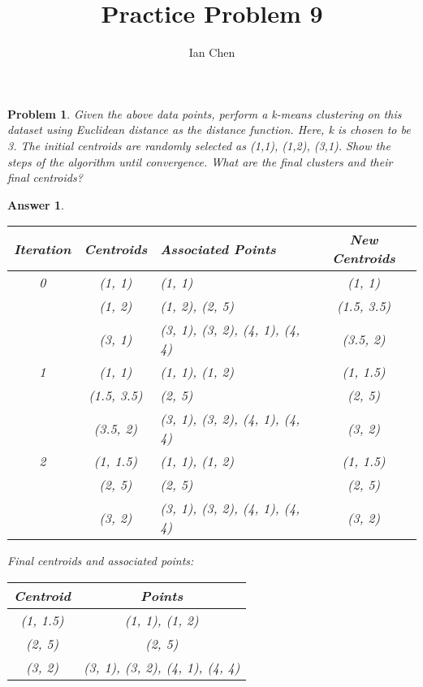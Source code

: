 \documentclass[11pt]{article}
\author{Ian Chen}
\title{Practice Problem 9}
\theoremstyle{description}
\newtheorem{problem}{Problem}
\theoremstyle{break}
\newtheorem*{answer}{Answer}
\begin{document}
    \maketitle

    \begin{problem}
        Given the above data points, perform a k-means clustering on this dataset using Euclidean
        distance as the distance function.
        Here, k is chosen to be 3.
        The initial centroids are randomly selected as (1,1), (1,2), (3,1).
        Show the steps of the algorithm until convergence.
        What are the final clusters and their final centroids?
    \end{problem}
    \begin{answer}
        \begin{tabular}{c|c|l|c}
            Iteration & Centroids & Associated Points              & New Centroids \\
            \hline
            0         & (1, 1)    & (1, 1)                         & (1, 1)        \\
            & (1, 2)    & (1, 2), (2, 5)                 & (1.5, 3.5)    \\
            & (3, 1)    & (3, 1), (3, 2), (4, 1), (4, 4) & (3.5, 2)      \\
            \hline
            1 & (1, 1) & (1, 1), (1, 2) & (1, 1.5)\\
            & (1.5, 3.5) & (2, 5) & (2, 5)\\
            & (3.5, 2) & (3, 1), (3, 2), (4, 1), (4, 4) & (3, 2)\\
            \hline
            2 & (1, 1.5) & (1, 1), (1, 2) & (1, 1.5)\\
            & (2, 5) & (2, 5) & (2, 5)\\
            & (3, 2) & (3, 1), (3, 2), (4, 1), (4, 4) & (3, 2)\\
        \end{tabular}
        \bigbreak
        Final centroids and associated points:\\
        \begin{tabular}{c|c}
            Centroid & Points\\
            \hline
            (1, 1.5) & (1, 1), (1, 2)\\
            (2, 5) & (2, 5)\\
            (3, 2) & (3, 1), (3, 2), (4, 1), (4, 4)\\
        \end{tabular}
    \end{answer}
\end{document}
